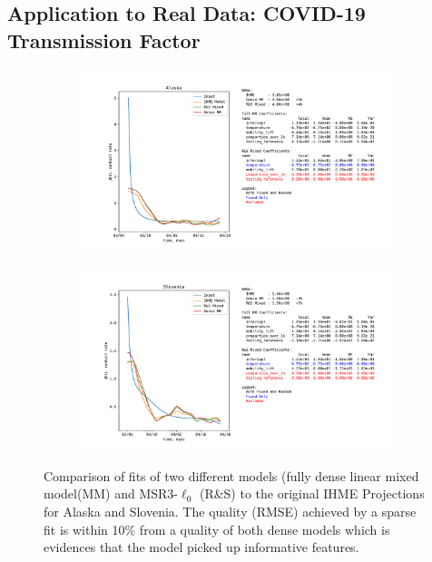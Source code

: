 \subsection{Application to Real Data: COVID-19 Transmission Factor}
\label{ch:covid}
\begin{figure}
	\begin{subfigure}[b]{\textwidth}
		\includegraphics[width=\textwidth]{figures/fit_Alaska}
	\end{subfigure}
	\begin{subfigure}[b]{\textwidth}
		\includegraphics[width=\textwidth]{figures/fit_Slovenia}	
	\end{subfigure}
	\caption{\label{fig:covid_feature_selection_1} Comparison of fits of two different models (fully dense linear mixed model(MM) and MSR3-$\ell_0$ (R\&S) to the original IHME Projections for Alaska and Slovenia. The quality (RMSE) achieved by a sparse fit is within 10\% from a quality of both dense models which is evidences that the model picked up informative features.}
\end{figure}


